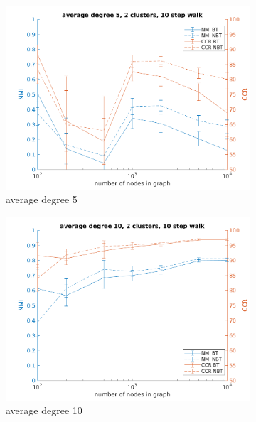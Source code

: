 \documentclass{article} %
\begin{document}
\begin{figure}[H] %
        \begin{subfigure}{0.33\textwidth}
        \includegraphics[width=\linewidth]{fig2/C5K2len10} 
        \caption{average degree 5}
        \label{fig:subim21}
    \end{subfigure}
    \begin{subfigure}{0.33\textwidth}
        \includegraphics[width=\linewidth]{fig2/C10K2len10}
        \caption{average degree 10}
        \label{fig:subim22}
    \end{subfigure}
    \begin{subfigure}{0.33\textwidth}
        \centering

\end{subfigure}
\end{figure}
\end{document}
